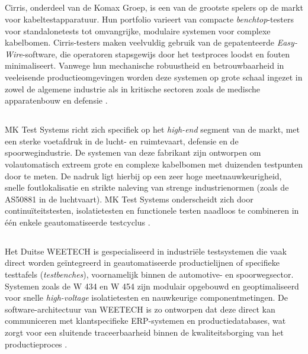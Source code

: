 \subsection{} 
\label{ssec:Cirris}

Cirris, onderdeel van de Komax Groep, is een van de grootste spelers op de markt voor kabeltestapparatuur. Hun portfolio varieert van compacte \textit{benchtop}-testers voor standalonetests tot omvangrijke, modulaire systemen voor complexe kabelbomen. Cirris-testers maken veelvuldig gebruik van de gepatenteerde \textit{Easy-Wire}-software, die operatoren stapsgewijs door het testproces loodst en fouten minimaliseert. Vanwege hun mechanische robuustheid en betrouwbaarheid in veeleisende productieomgevingen worden deze systemen op grote schaal ingezet in zowel de algemene industrie als in kritische sectoren zoals de medische apparatenbouw en defensie \autocite{Cirris2025}.

\subsection{} 
\label{ssec:MKTestSystems}

MK Test Systems richt zich specifiek op het \textit{high-end} segment van de markt, met een sterke voetafdruk in de lucht- en ruimtevaart, defensie en de spoorwegindustrie. De systemen van deze fabrikant zijn ontworpen om volautomatisch extreem grote en complexe kabelbomen met duizenden testpunten door te meten. De nadruk ligt hierbij op een zeer hoge meetnauwkeurigheid, snelle foutlokalisatie en strikte naleving van strenge industrienormen (zoals de AS50881 in de luchtvaart). MK Test Systems onderscheidt zich door continuïteitstesten, isolatietesten en functionele testen naadloos te combineren in één enkele geautomatiseerde testcyclus \autocite{MKTest2024}.

\subsection{} 
\label{ssec:WEETECH}

Het Duitse WEETECH is gespecialiseerd in industriële testsystemen die vaak direct worden geïntegreerd in geautomatiseerde productielijnen of specifieke testtafels (\textit{testbenches}), voornamelijk binnen de automotive- en spoorwegsector. Systemen zoals de W 434 en W 454 zijn modulair opgebouwd en geoptimaliseerd voor snelle \textit{high-voltage} isolatietesten en nauwkeurige componentmetingen. De software-architectuur van WEETECH is zo ontworpen dat deze direct kan communiceren met klantspecifieke ERP-systemen en productiedatabases, wat zorgt voor een sluitende traceerbaarheid binnen de kwaliteitsborging van het productieproces \autocite{Weetech2025}.

